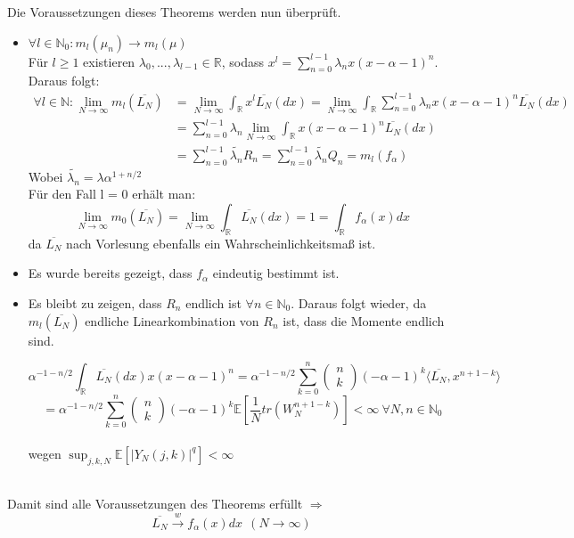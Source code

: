 \documentclass[a4paper, 11pt]{scrreprt}
\newcommand{\RR}{\mathbb{R}}
\newcommand{\EE}{\mathbb{E}}
\newcommand{\NN}{\mathbb{N}}
\begin{document}
Die Voraussetzungen dieses Theorems werden nun überprüft.
\begin{itemize}
\item $ \forall l \in \NN_0: m_l(\mu_n) \to m_l(\mu) $\\
Für $l \geq 1$ existieren $\lambda_0,...,\lambda_{l-1} \in \RR$, sodass $x^l = \sum_{n=0}^{l-1} \lambda_n x (x-\alpha-1)^n$. Daraus folgt:
\begin{align*}
\forall l \in \NN: \lim_{N \to \infty} m_l(\overline{L_{N}}) 
&= \lim_{N \to \infty} \int_\RR x^l \overline{L_{N}}(dx)
= \lim_{N \to \infty} \int_\RR \sum_{n=0}^{l-1} \lambda_n x (x-\alpha-1)^n \overline{L_{N}}(dx) \\
&= \sum_{n=0}^{l-1} \lambda_n \lim_{N \to \infty} \int_\RR x (x-\alpha-1)^n \overline{L_{N}}(dx) \\
&= \sum_{n=0}^{l-1} \tilde{\lambda_n} R_n
= \sum_{n=0}^{l-1} \tilde{\lambda_n} Q_n = m_l(f_\alpha)
\end{align*}
Wobei $ \tilde{\lambda_n}= \lambda \alpha ^{1+n/2}$\\

Für den Fall l = 0 erhält man:
\[\lim_{N \to \infty} m_0(\overline{L_{N}}) 
= \lim_{N \to \infty} \int_\RR \overline{L_{N}}(dx) = 1 
= \int_\RR f_\alpha(x)dx\]
da $ \overline{L_N} $ nach Vorlesung ebenfalls ein Wahrscheinlichkeitsmaß ist.

\item Es wurde bereits gezeigt, dass $ f_\alpha $ eindeutig bestimmt ist. 
\item Es bleibt zu zeigen, dass $ R_n $ endlich ist $ \forall n \in \NN_0 $. Daraus folgt wieder, da $ m_l(\overline{L_N}) $ endliche Linearkombination von $R_n$ ist, dass die Momente endlich sind.

 \[ \alpha^{-1-n/2} \int_{\RR}\overline{L_{N}}(dx)x(x-\alpha-1)^{n} = \alpha^{-1-n/2}\sum_{k=0}^n \begin{pmatrix} n\\k\end{pmatrix} (-\alpha -1)^k \langle \overline{L_N}, x^{n+1-k} \rangle \] 
\[= \alpha^{-1-n/2}\sum_{k=0}^n \begin{pmatrix} n\\k\end{pmatrix} (-\alpha -1)^k \EE [\dfrac{1}{N} tr(W_N^{n+1-k})]
< \infty ~\forall N,n \in \NN_0 \]\\
wegen $ \sup_{j,k,N} \EE[\vert Y_N(j,k)\vert ^{q}]< \infty$ \\\\
\end{itemize}
Damit sind alle Voraussetzungen des Theorems erfüllt $ \Rightarrow $  \[ \overline{L_N} \overset{w}{\rightarrow} f_\alpha (x)dx~~(N \to \infty) \]
\end{document}

